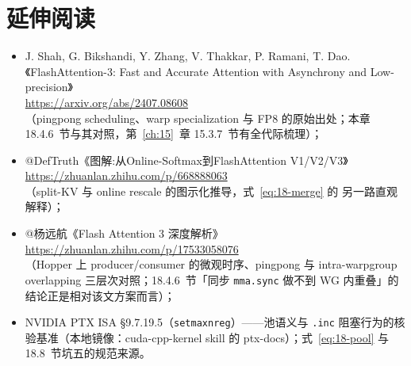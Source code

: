 \section*{延伸阅读}

\begin{itemize}
  \item J. Shah, G. Bikshandi, Y. Zhang, V. Thakkar, P. Ramani, T. Dao.
        《FlashAttention-3: Fast and Accurate Attention
        with Asynchrony and Low-precision》\\
        \url{https://arxiv.org/abs/2407.08608}\\
        （pingpong scheduling、warp specialization 与 FP8 的原始出处；本章
        18.4.6~节与其对照，第~\ref{ch:15}~章 15.3.7~节有全代际梳理）；
  \item @DefTruth《图解:从Online-Softmax到FlashAttention V1/V2/V3》\\
        \url{https://zhuanlan.zhihu.com/p/668888063}\\
        （split-KV 与 online rescale 的图示化推导，式~\ref{eq:18-merge} 的
        另一路直观解释）；
  \item @杨远航《Flash Attention 3 深度解析》\\
        \url{https://zhuanlan.zhihu.com/p/17533058076}\\
        （Hopper 上 producer/consumer 的微观时序、pingpong 与
        intra-warpgroup overlapping 三层次对照；18.4.6~节「同步
        \texttt{mma.sync} 做不到 WG 内重叠」的结论正是相对该文方案而言）；
  \item NVIDIA PTX ISA §9.7.19.5（\texttt{setmaxnreg}）——池语义与
        \texttt{.inc} 阻塞行为的核验基准（本地镜像：cuda-cpp-kernel skill 的
        ptx-docs）；式~\ref{eq:18-pool} 与 18.8~节坑五的规范来源。
\end{itemize}
